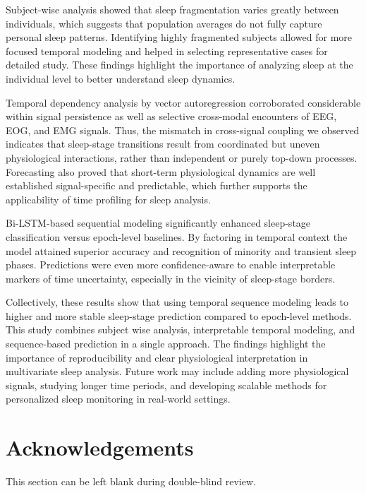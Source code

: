 \documentclass[10pt]{cai26}
\begin{document}
Subject-wise analysis showed that sleep fragmentation varies greatly between individuals, which suggests that population averages 
do not fully capture personal sleep patterns. Identifying highly fragmented subjects allowed for more focused temporal modeling and 
helped in selecting representative cases for detailed study. These findings highlight the importance of analyzing sleep at the 
individual level to better understand sleep dynamics.

Temporal dependency analysis by vector autoregression corroborated considerable within signal persistence as well as selective 
cross-modal encounters of EEG, EOG, and EMG signals. Thus, the mismatch in cross-signal coupling we observed indicates that 
sleep-stage transitions result from coordinated but uneven physiological interactions, rather than independent or purely top-down 
processes. Forecasting also proved that short-term physiological dynamics are well established signal-specific and predictable, 
which further supports the applicability of time profiling for sleep analysis. 

Bi-LSTM-based sequential modeling significantly enhanced sleep-stage classification versus epoch-level baselines. By factoring in 
temporal context the model attained superior accuracy and recognition of minority and transient sleep phases. Predictions were 
even more confidence-aware to enable interpretable markers of time uncertainty, especially in the vicinity of sleep-stage borders. 

Collectively, these results show that using temporal sequence modeling leads to higher and more stable sleep-stage prediction compared to 
epoch-level methods. This study combines subject wise analysis, interpretable temporal modeling, and sequence-based prediction in a 
single approach. The findings highlight the importance of reproducibility and clear physiological interpretation in multivariate sleep 
analysis. Future work may include adding more physiological signals, studying longer time periods, and developing scalable methods for 
personalized sleep monitoring in real-world settings.

\section*{Acknowledgements}
This section can be left blank during double-blind review. 

\appendix

\printbibliography[heading=subbibintoc]
\end{document}
